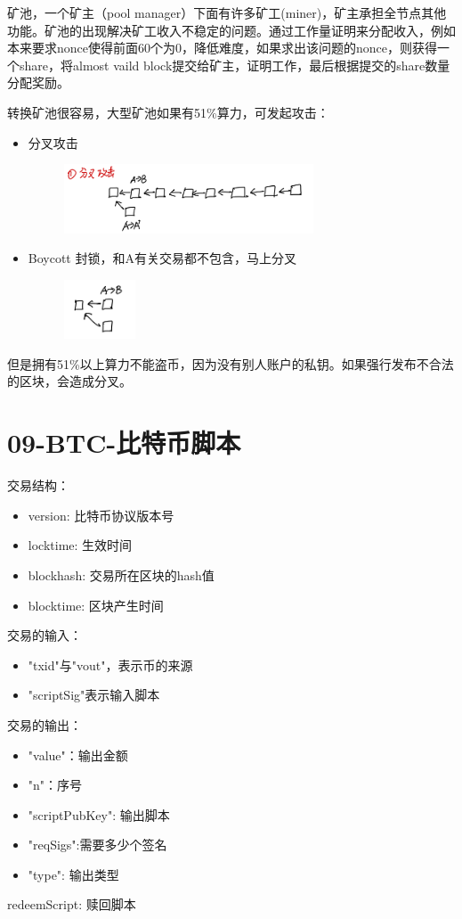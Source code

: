 \documentclass[10pt]{ctexart}
\begin{document}
矿池，一个矿主（pool manager）下面有许多矿工(miner)，矿主承担全节点其他功能。矿池的出现解决矿工收入不稳定的问题。通过工作量证明来分配收入，例如本来要求nonce使得前面60个为0，降低难度，如果求出该问题的nonce，则获得一个share，将almost vaild block提交给矿主，证明工作，最后根据提交的share数量分配奖励。

转换矿池很容易，大型矿池如果有51\%算力，可发起攻击：
\begin{itemize}
    \item 分叉攻击
    \begin{figure}[H]
        \centering
        \includegraphics[width=0.7\textwidth]{./lecture8/img1.png} 
    \end{figure}
    \item Boycott 封锁，和A有关交易都不包含，马上分叉
    \begin{figure}[H]
        \centering
        \includegraphics[width=0.2\textwidth]{./lecture8/img2.png} 
    \end{figure}
\end{itemize}
但是拥有51\%以上算力不能盗币，因为没有别人账户的私钥。如果强行发布不合法的区块，会造成分叉。

  
\section{09-BTC-比特币脚本}
交易结构：
\begin{itemize}
    \item version: 比特币协议版本号
    \item locktime: 生效时间
    \item blockhash: 交易所在区块的hash值
    \item blocktime: 区块产生时间
\end{itemize}
交易的输入：
\begin{itemize}
    \item "txid"与"vout"，表示币的来源
    \item "scriptSig"表示输入脚本
\end{itemize}
交易的输出：
\begin{itemize}
    \item "value"：输出金额
    \item "n"：序号
    \item "scriptPubKey": 输出脚本
    \item "reqSigs":需要多少个签名
    \item "type": 输出类型
\end{itemize}
redeemScript: 赎回脚本
\end{document}
